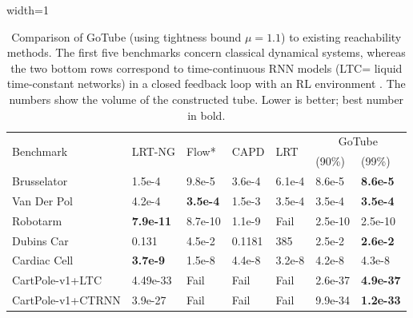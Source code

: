 \documentclass[letterpaper]{article} %
\begin{document}
\begin{table}[t]
    \centering
    \caption{Comparison of GoTube (using tightness bound $\mu=1.1$) to existing reachability methods. The first five benchmarks concern classical dynamical systems, whereas the two bottom rows correspond to time-continuous RNN models (LTC= liquid time-constant networks) in a closed feedback loop with an RL environment \cite{Hasani2021liquid,vorbach2021causal}. The numbers show the volume of the constructed tube. Lower is better; best number in bold.    }
    \begin{adjustbox}{width=1\columnwidth}
    \begin{tabular}{l|llll|ll}
    \toprule \multirow{2}{*}{Benchmark} & \multirow{2}{*}{LRT-NG} &\multirow{2}{*}{Flow*}  &\multirow{2}{*}{CAPD}  & \multirow{2}{*}{LRT} & \multicolumn{2}{c}{GoTube}\\
         &    &   &  &  & (90\%) & (99\%)\\
       \midrule
       Brusselator  & 1.5e-4 & 9.8e-5  & 3.6e-4 & 6.1e-4 & 8.6e-5 & \textbf{8.6e-5} \\
       Van Der Pol &  4.2e-4 & \textbf{3.5e-4} & 1.5e-3  &  3.5e-4 & 3.5e-4 &  \textbf{3.5e-4} \\
       Robotarm & \textbf{7.9e-11} & 8.7e-10  & 1.1e-9 & Fail &  2.5e-10 & 2.5e-10 \\
       Dubins Car & 0.131  & 4.5e-2 & 0.1181 & 385 &  2.5e-2 & \textbf{2.6e-2} \\
       Cardiac Cell &  \textbf{3.7e-9} & 1.5e-8 & 4.4e-8  & 3.2e-8 &   4.2e-8 &  4.3e-8 \\
       \midrule
       CartPole-v1+LTC  & 4.49e-33  & Fail & Fail & Fail & 2.6e-37 &  \textbf{4.9e-37}  \\
       CartPole-v1+CTRNN  & 3.9e-27  & Fail & Fail & Fail &  9.9e-34 &  \textbf{1.2e-33}   \\
      \bottomrule
    \end{tabular}
    \end{adjustbox}
    \label{tab:volume}
\end{table}
\end{document}
